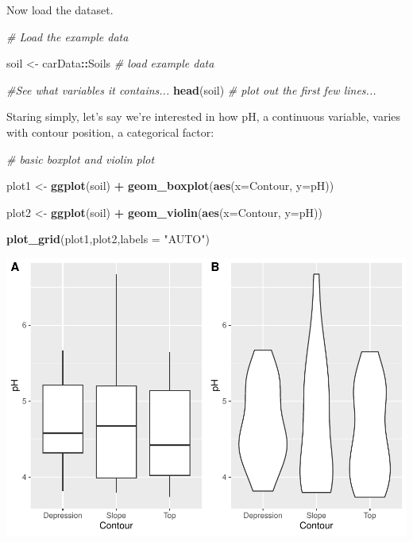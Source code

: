 \documentclass[
]{article}
\newenvironment{Shaded}{\begin{snugshade}}{\end{snugshade}}
\newcommand{\AttributeTok}[1]{\textcolor[rgb]{0.13,0.29,0.53}{#1}}
\newcommand{\CommentTok}[1]{\textcolor[rgb]{0.56,0.35,0.01}{\textit{#1}}}
\newcommand{\FunctionTok}[1]{\textcolor[rgb]{0.13,0.29,0.53}{\textbf{#1}}}
\newcommand{\NormalTok}[1]{#1}
\newcommand{\OtherTok}[1]{\textcolor[rgb]{0.56,0.35,0.01}{#1}}
\newcommand{\SpecialCharTok}[1]{\textcolor[rgb]{0.81,0.36,0.00}{\textbf{#1}}}
\newcommand{\StringTok}[1]{\textcolor[rgb]{0.31,0.60,0.02}{#1}}
\begin{document}
Now load the dataset.

\begin{Shaded}
\begin{Highlighting}[]
\CommentTok{\# Load the example data }

\NormalTok{soil }\OtherTok{\textless{}{-}}\NormalTok{ carData}\SpecialCharTok{::}\NormalTok{Soils    }\CommentTok{\# load example data}

\CommentTok{\#See what variables it contains...}
\FunctionTok{head}\NormalTok{(soil)    }\CommentTok{\# plot out the first few lines...}
\end{Highlighting}
\end{Shaded}

Staring simply, let's say we're interested in how pH, a continuous
variable, varies with contour position, a categorical factor:

\begin{Shaded}
\begin{Highlighting}[]
\CommentTok{\# basic boxplot and violin plot}

\NormalTok{plot1 }\OtherTok{\textless{}{-}} \FunctionTok{ggplot}\NormalTok{(soil) }\SpecialCharTok{+}
  \FunctionTok{geom\_boxplot}\NormalTok{(}\FunctionTok{aes}\NormalTok{(}\AttributeTok{x=}\NormalTok{Contour, }\AttributeTok{y=}\NormalTok{pH))}

\NormalTok{plot2 }\OtherTok{\textless{}{-}} \FunctionTok{ggplot}\NormalTok{(soil) }\SpecialCharTok{+} 
  \FunctionTok{geom\_violin}\NormalTok{(}\FunctionTok{aes}\NormalTok{(}\AttributeTok{x=}\NormalTok{Contour, }\AttributeTok{y=}\NormalTok{pH))}

\FunctionTok{plot\_grid}\NormalTok{(plot1,plot2,}\AttributeTok{labels =} \StringTok{"AUTO"}\NormalTok{)}
\end{Highlighting}
\end{Shaded}

\includegraphics{module1_3_files/figure-latex/unnamed-chunk-24-1.pdf}
\end{document}
